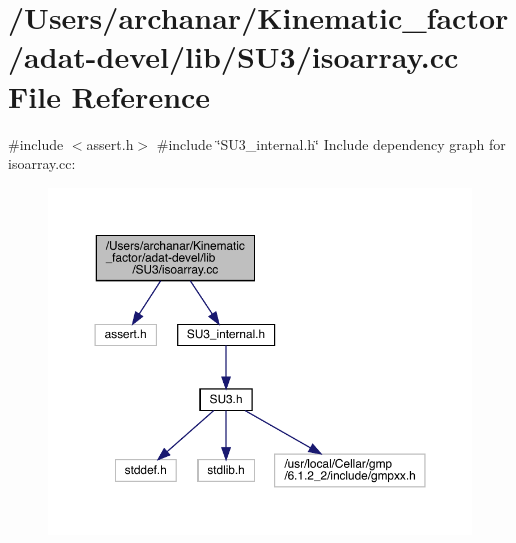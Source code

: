 \hypertarget{adat-devel_2lib_2SU3_2isoarray_8cc}{}\section{/\+Users/archanar/\+Kinematic\+\_\+factor/adat-\/devel/lib/\+S\+U3/isoarray.cc File Reference}
\label{adat-devel_2lib_2SU3_2isoarray_8cc}
{\ttfamily \#include $<$assert.\+h$>$}\newline
{\ttfamily \#include \char`\"{}S\+U3\+\_\+internal.\+h\char`\"{}}\newline
Include dependency graph for isoarray.\+cc\+:
\nopagebreak
\begin{figure}[H]
\begin{center}
\leavevmode
\includegraphics[width=350pt]{dd/d41/adat-devel_2lib_2SU3_2isoarray_8cc__incl}
\end{center}
\end{figure}
